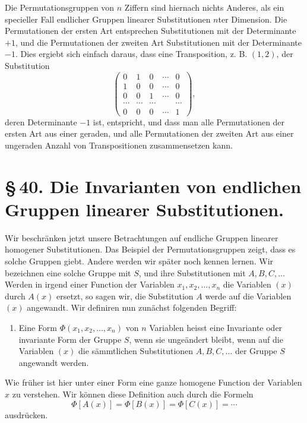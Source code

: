 \documentclass[11pt]{article}
\begin{document}
Die Permutationsgruppen von $n$ Ziffern sind hiernach nichts Anderes, als ein specieller Fall endlicher Gruppen linearer Substitutionen $n$ter Dimension. Die Permutationen der ersten Art entsprechen Substitutionen mit der Determinante $+1$, und die Permutationen der zweiten Art Substitutionen mit der Determinante $-1$. Dies ergiebt sich einfach daraus, dass eine Transposition, z. B. $(1,2)$, der Substitution
\[
\begin{pmatrix}
0&1&0&\cdots&0\\
1&0&0&\cdots&0\\
0&0&1&\cdots&0\\
\cdots&\cdots&\cdots&&\cdots\\
0&0&0&\cdots&1
\end{pmatrix},
\]
deren Determinante $-1$ ist, entspricht, und dass man alle Permutationen der ersten Art aus einer geraden, und alle Permutationen der zweiten Art aus einer ungeraden Anzahl von Transpositionen zusammensetzen kann.

\section*{\S\,40. Die Invarianten von endlichen Gruppen linearer Substitutionen.}

Wir beschränken jetzt unsere Betrachtungen auf endliche Gruppen linearer homogener Substitutionen. Das Beispiel der Permutationsgruppen zeigt, dass es solche Gruppen giebt. Andere werden wir später noch kennen lernen. Wir bezeichnen eine solche Gruppe mit $S$, und ihre Substitutionen mit $A,B,C,\ldots$ Werden in irgend einer Function der Variablen $x_1,x_2,\ldots,x_n$ die Variablen $(x)$ durch $A(x)$ ersetzt, so sagen wir, die Substitution $A$ werde auf die Variablen $(x)$ angewandt. Wir definiren nun zunächst folgenden Begriff:

\begin{enumerate}[label=\arabic*.,leftmargin=2.2em]
\item Eine Form $\Phi(x_1,x_2,\ldots,x_n)$ von $n$ Variablen heisst eine Invariante oder invariante Form der Gruppe $S$, wenn sie ungeändert bleibt, wenn auf die Variablen $(x)$ die sämmtlichen Substitutionen $A,B,C,\ldots$ der Gruppe $S$ angewandt werden.
\end{enumerate}
Wie früher ist hier unter einer Form eine ganze homogene Function der Variablen $x$ zu verstehen. Wir können diese Definition auch durch die Formeln
\begin{equation}
\Phi[A(x)]=\Phi[B(x)]=\Phi[C(x)]=\cdots
\tag{1}
\end{equation}
ausdrücken.
\end{document}
